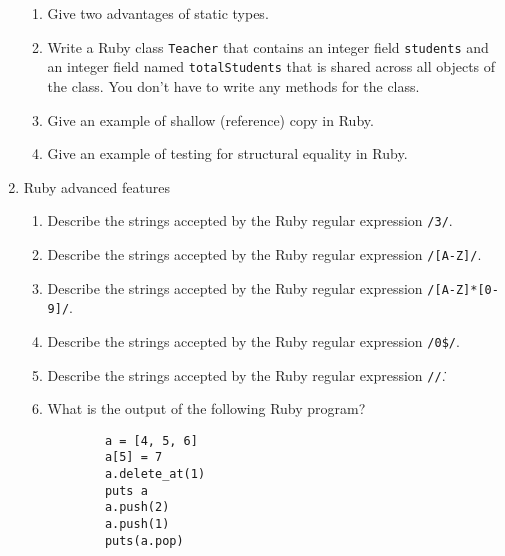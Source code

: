\documentclass[11pt]{article}
\begin{document}
\begin{enumerate}
\begin{enumerate}
            \item Give two advantages of static types.

            \item \sloppy Write a Ruby class \texttt{Teacher} that contains
                  an integer field \texttt{students} and an integer field
                  named \texttt{totalStudents} that is shared across all
                  objects of the class.  You don't have to write any methods
                  for the class. \fussy

            \item Give an example of shallow (reference) copy in Ruby.

            \item Give an example of testing for structural equality in
                  Ruby.

          \end{enumerate}

    \item Ruby advanced features

          \vspace{-1.5mm}

          \begin{enumerate}

            \addtolength{\itemsep}{3mm}

            \item Describe the strings accepted by the Ruby regular
                  expression \texttt{/3\string{2\string}/}.

            \item Describe the strings accepted by the Ruby regular
                  expression \texttt{/[A-Z]/}.

            \item Describe the strings accepted by the Ruby regular
                  expression \texttt{/[A-Z]*[0-9]/}.

            \item Describe the strings accepted by the Ruby regular
                  expression \texttt{/0\$/}.

            \item Describe the strings accepted by the Ruby regular
                  expression \texttt{/\string\./}.

            \item What is the output of the following Ruby program?

                  \begin{Verbatim}
        a = [4, 5, 6]
        a[5] = 7
        a.delete_at(1)
        puts a
        a.push(2)
        a.push(1)
        puts(a.pop)
                  \end{Verbatim}


\end{enumerate}
\end{enumerate}
\end{document}
